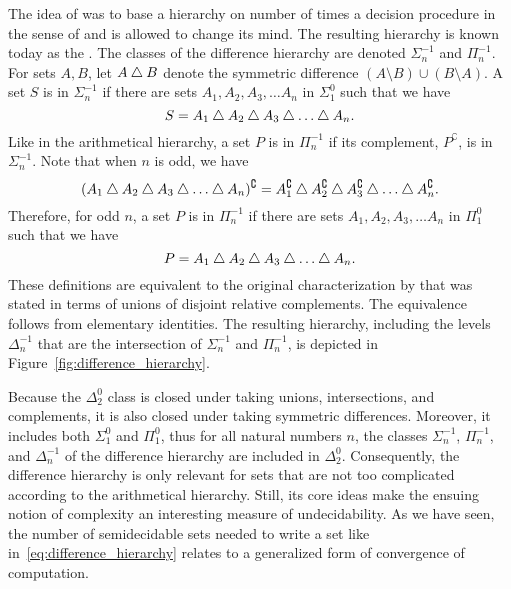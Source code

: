 The idea of \citeauthor{ershov1968hierarchyi} was to base a hierarchy on number of times a decision procedure in the sense of \citeauthor{putnam1965trial} and \citeauthor{gold1965limiting} is allowed to change its mind.
The resulting hierarchy is known today as the  \parencite{downey2010algorithmic}.
The classes of the difference hierarchy are denoted $\Sigma^{-1}_n$ and $\Pi^{-1}_n$.
For sets $A, B$, let $A \bigtriangleup B$ denote the symmetric difference $(A \setminus B) \cup (B \setminus A)$.
A set $S$ is in $\Sigma^{-1}_n$ if there are sets $A_1, A_2, A_3, \ldots A_n$ in $\Sigma^0_1$ such that we have
\begin{equation}
\label{eq:difference_hierarchy}
  S = A_1 \bigtriangleup A_2 \bigtriangleup A_3 \bigtriangleup \ldots \bigtriangleup A_n.
\end{equation}
Like in the arithmetical hierarchy, a set $P$ is in $\Pi^{-1}_n$ if its complement, $P^\complement$, is in~$\Sigma^{-1}_n$.
Note that when $n$ is odd, we have
\begin{equation*}
  (A_1 \bigtriangleup A_2 \bigtriangleup A_3 \bigtriangleup \ldots \bigtriangleup A_n)^\complement = A_1^\complement \bigtriangleup A_2^\complement \bigtriangleup A_3^\complement \bigtriangleup \ldots \bigtriangleup A_n^\complement.
\end{equation*}
Therefore, for odd $n$, a set $P$ is in $\Pi^{-1}_n$ if there are sets $A_1, A_2, A_3, \ldots A_n$ in $\Pi^0_1$ such that we have
\begin{equation*}
  P = A_1 \bigtriangleup A_2 \bigtriangleup A_3 \bigtriangleup \ldots \bigtriangleup A_n.
\end{equation*}
These definitions are equivalent to the original characterization by \textcite{ershov1968hierarchyi} that was stated in terms of unions of disjoint relative complements.
The equivalence follows from elementary identities.
The resulting hierarchy, including the levels~$\Delta^{-1}_n$ that are the intersection of $\Sigma^{-1}_n$ and $\Pi^{-1}_n$, is depicted in Figure~\ref{fig:difference_hierarchy}.

Because the $\Delta^0_2$ class is closed under taking unions, intersections, and complements, it is also closed under taking symmetric differences.
Moreover, it includes both $\Sigma^0_1$ and $\Pi^0_1$, thus for all natural numbers $n$, the classes $\Sigma^{-1}_n$, $\Pi^{-1}_n$, and $\Delta^{-1}_n$ of the difference hierarchy are included in $\Delta^0_2$.
Consequently, the difference hierarchy is only relevant for sets that are not too complicated according to the arithmetical hierarchy.
Still, its core ideas make the ensuing notion of complexity an interesting measure of undecidability.
As we have seen, the number of semidecidable sets needed to write a set like in~\eqref{eq:difference_hierarchy} relates to a generalized form of convergence of computation.


